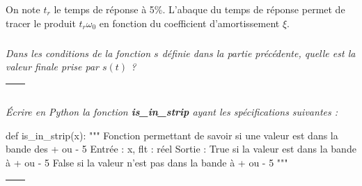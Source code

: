 \documentclass[10pt]{article}
\newif\ifprof
\begin{document}
On note $t_r$  le temps de réponse à 5\%. L'abaque du temps de réponse permet de tracer le produit $t_r\omega_0$ en fonction du coefficient d'amortissement $\xi$.

\subparagraph{}
\textit{Dans les conditions de la fonction $s$ définie dans la partie précédente, quelle est la valeur finale prise par $s(t)$ ?} 
\ifprof
\begin{corrige}
La valeur finale est 1. 
\end{corrige}
\else


\begin{tabular}{|p{}|}
\hline
$$\quad$$ \\
\hline
\end{tabular}

\fi


\subparagraph{}
\textit{Écrire en Python la fonction \textsf{\textbf{is\_in\_strip}} ayant les spécifications suivantes : } 
\ifprof
\else

\begin{py}
\begin{python}
def is_in_strip(x):
    """
    Fonction permettant de savoir si une valeur est dans la bande des + ou - 5%
    Entrée : 
        x, flt : réel
    Sortie : 
        True si la valeur est dans la bande à + ou - 5%
        False si la valeur n'est pas dans la bande à + ou - 5%
    """
\end{python}
\end{py}
\fi

\ifprof
\begin{corrige}
\begin{py}
\begin{python}
def is_in_strip(x):
    """
    Fonction permettant de savoir si une valeur est dans la bande des + ou - 5%
    Entrée : 
        x, flt : réel
    Sortie : 
        True si la valeur est dans la bande à + ou - 5%
        False si la valeur n'est pas dans la bande à + ou - 5%
    """
    if x>.95 and x<1.05:
        return True
    else:
        return False
\end{python}
\end{py}
\end{corrige}
\else


\begin{tabular}{|p{}|}
\hline
$$\quad$$
\vspace{2cm}
$$\quad$$ \\
\hline
\end{tabular}
\fi
\end{document}

